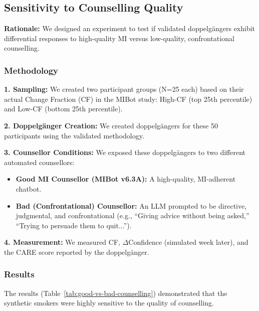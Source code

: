 \subsection{Sensitivity to Counselling Quality}

\textbf{Rationale:} We designed an experiment to test if validated doppelgängers exhibit differential responses to high-quality MI versus low-quality, confrontational counselling.

\subsubsection{Methodology}

\textbf{1. Sampling:} We created two participant groups (N=25 each) based on their actual Change Fraction (CF) in the MIBot study: High-CF (top 25th percentile) and Low-CF (bottom 25th percentile).

\textbf{2. Doppelgänger Creation:} We created doppelgängers for these 50 participants using the validated methodology.

\textbf{3. Counsellor Conditions:} We exposed these doppelgängers to two different automated counsellors:
\begin{itemize}
    \item \textbf{Good MI Counsellor (MIBot v6.3A):} A high-quality, MI-adherent chatbot.
    \item \textbf{Bad (Confrontational) Counsellor:} An LLM prompted to be directive, judgmental, and confrontational (e.g., ``Giving advice without being asked,'' ``Trying to persuade them to quit...'').
\end{itemize}

\textbf{4. Measurement:} We measured CF, $\Delta$Confidence (simulated week later), and the CARE score reported by the doppelgänger.

\subsubsection{Results}

The results (Table~\ref{tab:good-vs-bad-counselling}) demonstrated that the synthetic smokers were highly sensitive to the quality of counselling.

